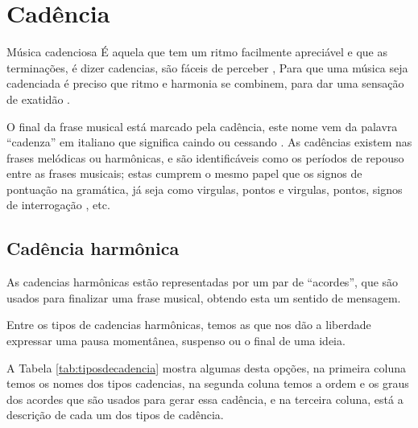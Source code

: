 \section{Cadência}
\label{sec:Cadencia}

\begin{tcbinformation}{Música cadenciosa}
\label{ref:musicacadenciosa}
É aquela que tem um ritmo facilmente apreciável e que as terminações, é dizer cadencias,
são fáceis de perceber \cite[pp. 60]{pedrell2009diccionario},
Para que uma música seja cadenciada é preciso que ritmo e harmonia se combinem, 
para dar uma sensação de exatidão \cite[pp. 68]{melcior1859diccionario}.
\end{tcbinformation} 


O final da frase musical está marcado pela cadência, 
este nome vem da palavra ``cadenza''  em italiano que significa caindo ou cessando \cite[pp. 34]{bennett1993elementos} \cite[pp. 68]{melcior1859diccionario}. 
As cadências existem nas frases melódicas ou harmônicas, 
e são identificáveis como os períodos de repouso entre as frases musicais;
estas cumprem o mesmo papel que os signos de pontuação na gramática, 
já seja como virgulas, pontos e virgulas, pontos, signos de interrogação
\cite[pp. 66,67]{melcior1859diccionario} \cite[pp. 34]{bennett1993elementos}, 
etc.


\subsection{Cadência harmônica}
\label{sec:CadenciaHarmonica}

As cadencias harmônicas estão representadas por um par de ``acordes'', 
que são usados para finalizar uma frase musical, obtendo esta um sentido de mensagem. 

Entre os tipos de cadencias harmônicas, 
temos as que nos dão a liberdade expressar uma pausa momentânea, suspenso ou o final de uma ideia.

A Tabela \ref{tab:tiposdecadencia} mostra algumas desta opções, 
na primeira coluna temos os nomes dos tipos cadencias,
na segunda coluna temos a ordem e os graus dos acordes que são usados para gerar essa cadência,
e na terceira coluna, está a descrição de cada um dos tipos de cadência.

